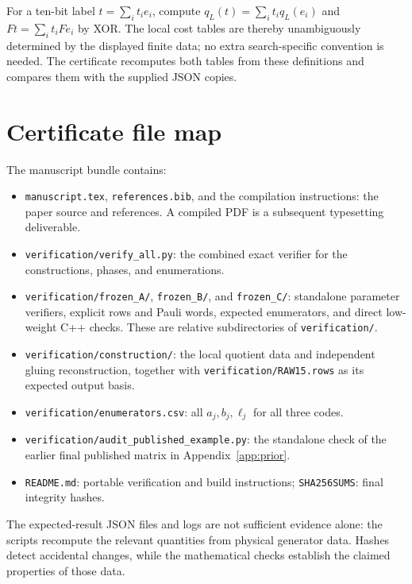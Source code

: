 \documentclass[11pt,a4paper]{article}
\begin{document}
For a ten-bit label $t=\sum_i t_i e_i$, compute $q_L(t)=\sum_i t_iq_L(e_i)$ and $Ft=\sum_i t_iFe_i$ by XOR. The local cost tables are thereby unambiguously determined by the displayed finite data; no extra search-specific convention is needed. The certificate recomputes both tables from these definitions and compares them with the supplied JSON copies.

\section{Certificate file map}\label{app:files}
The manuscript bundle contains:
\begin{itemize}
\item \texttt{manuscript.tex}, \texttt{references.bib}, and the compilation instructions: the paper source and references. A compiled PDF is a subsequent typesetting deliverable.
\item \texttt{verification/verify\_all.py}: the combined exact verifier for the constructions, phases, and enumerations.
\item \texttt{verification/frozen\_A/}, \texttt{frozen\_B/}, and \texttt{frozen\_C/}: standalone parameter verifiers, explicit rows and Pauli words, expected enumerators, and direct low-weight C++ checks. These are relative subdirectories of \texttt{verification/}.
\item \texttt{verification/construction/}: the local quotient data and independent gluing reconstruction, together with \texttt{verification/RAW15.rows} as its expected output basis.
\item \texttt{verification/enumerators.csv}: all $a_j,b_j,\ell_j$ for all three codes.
\item \texttt{verification/audit\_published\_example.py}: the standalone check of the earlier final published matrix in Appendix~\ref{app:prior}.
\item \texttt{README.md}: portable verification and build instructions; \texttt{SHA256SUMS}: final integrity hashes.
\end{itemize}
The expected-result JSON files and logs are not sufficient evidence alone: the scripts recompute the relevant quantities from physical generator data. Hashes detect accidental changes, while the mathematical checks establish the claimed properties of those data.
\end{document}
